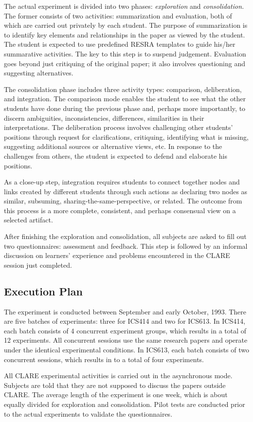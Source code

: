 The actual experiment is divided into two phases: {\it exploration\/} and
{\it consolidation.\/}  The former consists of two activities: summarization
and evaluation, both of which are carried out privately by each student.
The purpose of summarization is to identify key elements and relationships
in the paper as viewed by the student. The student is expected to use
predefined RESRA templates to guide his/her summarative activities. The key
to this step is to suspend judgement. Evaluation goes beyond just
critiquing of the original paper; it also involves questioning and
suggesting alternatives.

The consolidation phase includes three activity types: comparison,
deliberation, and integration. The comparison mode enables the student to
see what the other students have done during the previous phase and,
perhaps more importantly, to discern ambiguities, inconsistencies,
differences, similarities in their interpretations. The deliberation
process involves challenging other students' positions through request for
clarifications, critiquing, identifying what is missing, suggesting
additional sources or alternative views, etc.  In response to the
challenges from others, the student is expected to defend and elaborate his
positions.

As a close-up step, integration requires students to connect together nodes
and links created by different students through such actions as declaring
two nodes as similar, subsuming, sharing-the-same-perspective, or related.
The outcome from this process is a more complete, consistent, and perhaps
consensual view on a selected artifact.

After finishing the exploration and consolidation, all subjects are asked
to fill out two questionnaires: assessment and feedback.  This step is
followed by an informal discussion on learners' experience and problems
encountered in the CLARE session just completed.

\subsection{Execution Plan}
\label{sec:exec-plan}

The experiment is conducted between September and early October, 1993.
There are five batches of experiments: three for ICS414 and two for ICS613.
In ICS414, each batch consists of 4 concurrent experiment groups, which
results in a total of 12 experiments. All concurrent sessions use the same
research papers and operate under the identical experimental conditions. In
ICS613, each batch consists of two concurrent sessions, which results in to
a total of four experiments.

All CLARE experimental activities is carried out in the asynchronous mode.
Subjects are told that they are not supposed to discuss the papers outside
CLARE. The average length of the experiment is one week, which is about
equally divided for exploration and consolidation. Pilot tests are
conducted prior to the actual experiments to validate the questionnaires.






